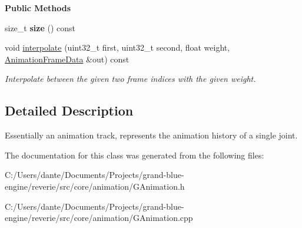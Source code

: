 \begin{Indent}\textbf{ Public Methods}\par
\begin{DoxyCompactItemize}
\item 
\mbox{\label{classrev_1_1_node_animation_ac31961cd0dce64ffaf02299367affafe}} 
size\+\_\+t {\bfseries size} () const
\item 
\mbox{\label{classrev_1_1_node_animation_a891bb079cd99970a9d6ce0c865b1646d}} 
void \mbox{\hyperlink{classrev_1_1_node_animation_a891bb079cd99970a9d6ce0c865b1646d}{interpolate}} (uint32\+\_\+t first, uint32\+\_\+t second, float weight, \mbox{\hyperlink{structrev_1_1_animation_frame_data}{Animation\+Frame\+Data}} \&out) const
\begin{DoxyCompactList}\small\item\em Interpolate between the given two frame indices with the given weight. \end{DoxyCompactList}\end{DoxyCompactItemize}
\end{Indent}


\subsection{Detailed Description}
Essentially an animation track, represents the animation history of a single joint. 

The documentation for this class was generated from the following files\+:\begin{DoxyCompactItemize}
\item 
C\+:/\+Users/dante/\+Documents/\+Projects/grand-\/blue-\/engine/reverie/src/core/animation/G\+Animation.\+h\item 
C\+:/\+Users/dante/\+Documents/\+Projects/grand-\/blue-\/engine/reverie/src/core/animation/G\+Animation.\+cpp\end{DoxyCompactItemize}
